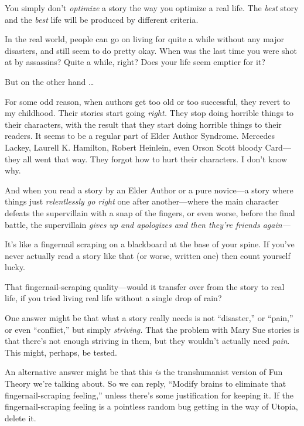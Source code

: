 {
 You simply don't \textit{optimize} a story the way
you optimize a real life. The \textit{best} story and the \textit{best}
life will be produced by different criteria.}

{
 In the real world, people can go on living for quite a while
without any major disasters, and still seem to do pretty okay. When was
the last time you were shot at by assassins? Quite a while, right? Does
your life seem emptier for it?}

{
 But on the other hand \ldots}

{
 For some odd reason, when authors get too old or too successful,
they revert to my childhood. Their stories start going \textit{right.}
They stop doing horrible things to their characters, with the result
that they start doing horrible things to their readers. It seems to be
a regular part of Elder Author Syndrome. Mercedes Lackey, Laurell K.
Hamilton, Robert Heinlein, even Orson Scott bloody Card---they all went
that way. They forgot how to hurt their characters. I
don't know why.}

{
 And when you read a story by an Elder Author or a pure novice---a
story where things just \textit{relentlessly go right} one after
another---where the main character defeats the supervillain with a snap
of the fingers, or even worse, before the final battle, the
supervillain \textit{gives up and apologizes and then
they're friends again---}}

{
 It's like a fingernail scraping on a blackboard at
the base of your spine. If you've never actually read a
story like that (or worse, written one) then count yourself lucky.}

{
 That fingernail-scraping quality---would it transfer over from the
story to real life, if you tried living real life without a single drop
of rain?}

{
 One answer might be that what a story really needs is not
``disaster,'' or
``pain,'' or even
``conflict,'' but simply
\textit{striving.} That the problem with Mary Sue stories is that
there's not enough striving in them, but they
wouldn't actually need \textit{pain}. This might,
perhaps, be tested.}

{
 An alternative answer might be that this \textit{is} the
transhumanist version of Fun Theory we're talking
about. So we can reply, ``Modify brains to eliminate
that fingernail-scraping feeling,'' unless
there's some justification for keeping it. If the
fingernail-scraping feeling is a pointless random bug getting in the
way of Utopia, delete it.}


